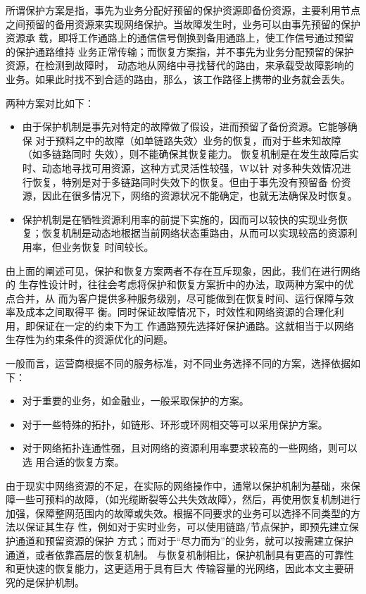 所谓保护方案是指，事先为业务分配好预留的保护资源即备份资源，主要利用节点 之间预留的备用资源来实现网络保护。当故障发生时，业务可以由事先预留的保护资源承 载，即将工作通路上的通信信号倒换到备用通路上，使工作信号通过预留的保护通路维持 业务正常传输；而恢复方案指，并不事先为业务分配预留的保护资源，在检测到故障时， 动态地从网络中寻找替代的路由，来承载受故障影响的业务。如果此时找不到合适的路由，那么，该工作路径上携带的业务就会丢失。

两种方案对比如下：
\begin{itemize}
  \item 由于保护机制是事先对特定的故障做了假设，进而预留了备份资源。它能够确保 对于预料之中的故障（如单链路失效〉业务的恢复，而对于些未知故障（如多链路同时 失效），则不能确保其恢复能力。
恢复机制是在发生故障后实时、动态地寻找可用资源，这种方式灵活性较强，W以针 对多种失效情况进行恢复，特别是对于多链路同时失效下的恢复。但由于事先没有预留备 份资源，因此在很多情况下，网络的资源状况不能确定，也就无法确保及时恢复。
  \item 保护机制是在牺牲资源利用率的前提下实施的，因而可以较快的实现业务恢复；恢复机制是动态地根据当前网络状态重路由，从而可以实现较高的资源利用率，但业务恢复 时间较长。
\end{itemize}
由上面的阐述可见，保护和恢复方案两者不存在互斥现象，因此，我们在进行网络的 生存性设计时，往往会考虑将保护和恢复方案折中的办法，取两种方案中的优点合并，从 而为客户提供多种服务级别，尽可能做到在恢复时间、运行保障与效率及成本之间取得平 衡。同时保证故障情况下，时效性和网络资源的合理化利用，即保证在一定的约束下为工 作通路预先选择好保护通路。这就相当于以网络生存性为约束条件的资源优化的问题。

一般而言，运营商根据不同的服务标准，对不同业务选择不同的方案，选择依据如下：
\begin{itemize}
  \item 对于重要的业务，如金融业，一般采取保护的方案。
  \item 对于一些特殊的拓扑，如链形、环形或环网相交等可以采用保护方案。
  \item 对于网络拓扑连通性强，且对网络的资源利用率要求较高的一些网络，则可以选
用合适的恢复方案。
\end{itemize}

由于现实中网络资源的不足，在实际的网络操作中，通常以保护机制为基础，來保 障一些可预料的故障，（如光缆断裂等公共失效故障〉，然后，再使用恢复机制进行加强，保障整网范围内的故障或失效。根据不同要求的业务可以选择不同类型的方法以保证其生存 性，例如对于实时业务，可以使用链路/节点保护，即预先建立保护通道和预留资源的保护 方式；而对于“尽力而为”的业务，就可以按需建立保护通道，或者依靠高层的恢复机制。 与恢复机制相比，保护机制具有更高的可靠性和更快速的恢复能力，这更适用于具有巨大 传输容量的光网络，因此本文主要研究的是保护机制。

